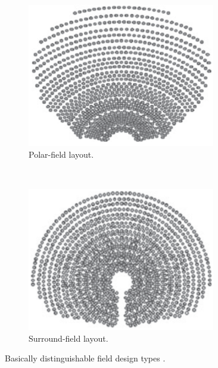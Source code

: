 \documentclass[Master,MEE,english]{twbook}%
\begin{document}
\begin{figure}[!htbp]
        \centering
        \begin{subfigure}[b]{0.5\textwidth}
                \centering
                \includegraphics[width=0.9\textwidth]{FIG/north_field_layout}
                \caption{Polar-field layout.}\label{north_field_layout}
        \end{subfigure}%
        ~
        \begin{subfigure}[b]{0.5\textwidth}
                \centering
                \includegraphics[width=0.9\textwidth]{FIG/sourround_field_layout}
                \caption{Surround-field layout.}\label{sourround_field_layout}
        \end{subfigure}
        \caption[Basically distinguishable field design types.]{Basically distinguishable field design types \cite{Kulichenko2012}.}\label{Fielddesign}
\end{figure}
\end{document}
